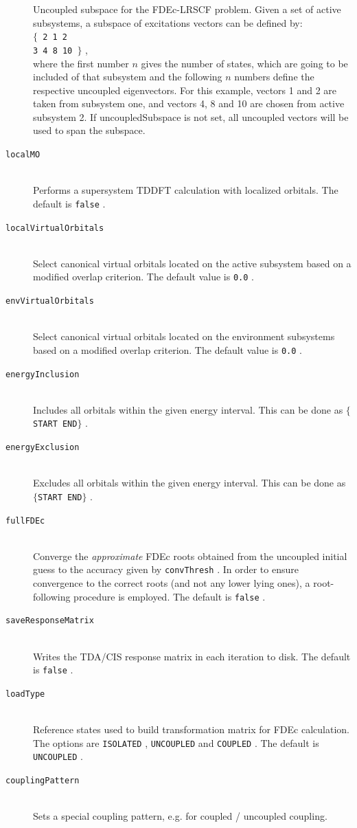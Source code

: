 \documentclass[bibliography=totocnumbered,a4paper,10pt,oneside]{scrbook}
\newcommand{\ttt}[1]{%
  \begingroup\setlength{\fboxsep}{1pt}%
  \colorbox{serenity-green!30}{\texttt{\hspace*{2pt}\vphantom{(g}#1\hspace*{2pt}}}%
  \endgroup
}
\begin{document}
\begin{description}
    Uncoupled subspace for the FDEc-LRSCF problem. Given a set of active subsystems, a subspace of excitations vectors can be defined by: \\  \ttt{$\{$ 2 1 2} \\
    \ttt{3 4 8 10 $\}$}, \\ where the first number $n$ gives the number of states, which are going to be included of that subsystem and the following $n$ numbers define the respective uncoupled eigenvectors. For this example, vectors 1 and 2 are taken from subsystem one, and vectors 4, 8 and 10 are chosen from active subsystem 2. If uncoupledSubspace is not set, all uncoupled vectors will be used to span the subspace.
    \item [\texttt{localMO}]\hfill \\
    Performs a supersystem TDDFT calculation with localized orbitals. The default is \ttt{false}.
    \item [\texttt{localVirtualOrbitals}]\hfill \\
    Select canonical virtual orbitals located on the active subsystem based on a modified overlap criterion. The default value is \ttt{0.0}.
    \item [\texttt{envVirtualOrbitals}]\hfill \\
    Select canonical virtual orbitals located on the environment subsystems based on a modified overlap criterion. The default value is \ttt{0.0}.
    \item [\texttt{energyInclusion}]\hfill \\
    Includes all orbitals within the given energy interval. This can be done as \ttt{$\{$START END$\}$}.
    \item [\texttt{energyExclusion}]\hfill \\
    Excludes all orbitals within the given energy interval. This can be done as \ttt{$\{$START END$\}$}.
    \item [\texttt{fullFDEc}]\hfill \\
    Converge the \emph{approximate} FDEc roots obtained from the uncoupled initial guess to the accuracy given by \ttt{convThresh}. In order to ensure convergence to the correct roots (and not any lower lying ones), a root-following procedure is employed. The default is \ttt{false}.
    \item [\texttt{saveResponseMatrix}]\hfill \\
    Writes the TDA/CIS response matrix in each iteration to disk. The default is \ttt{false}.
    \item [\texttt{loadType}]\hfill \\
    Reference states used to build transformation matrix for FDEc calculation. The options are \ttt{ISOLATED}, \ttt{UNCOUPLED} and \ttt{COUPLED}. The default is \ttt{UNCOUPLED}.
    \item[\texttt{couplingPattern}]\hfill\\
    Sets a special coupling pattern, e.g. for coupled / uncoupled coupling.
\end{description}
\end{document}
